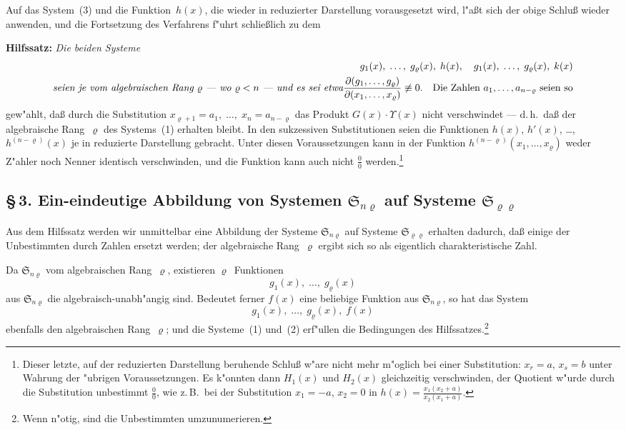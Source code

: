 \documentclass[11pt,a4paper]{article}
\begin{document}
Auf das System~(3) und die Funktion~$h(x)$, die wieder in reduzierter
Darstellung vorausgesetzt wird, l"{a}\ss{}t sich der obige Schlu\ss{} wieder anwenden,
und die Fortsetzung des Verfahrens f"{u}hrt schlie\ss{}lich zu dem

\medskip
\noindent
\textbf{Hilfssatz:} \emph{Die beiden Systeme}
\begin{align*}
g_{1}(x),\;\dots,\;g_{\varrho}(x),\;h(x),\quad g_{1}(x),\;\dots,\;g_{\varrho}(x),\;k(x)\\
\emph{seien je vom algebraischen Rang~$\varrho$ --- wo $\varrho<n$ --- und es sei etwa}
\frac{\partial(g_{1},\dots,g_{\varrho})}{\partial(x_{1},\dots,x_{\varrho})}\not\equiv 0.\quad \text{Die Zahlen } a_{1},\dots,a_{n-\varrho}\text{ seien so}
\end{align*}
gew"{a}hlt, da\ss{} durch die Substitution
$x_{\varrho+1}=a_{1},\;\dots,\;x_{n}=a_{n-\varrho}$
das Produkt $G(x)\cdot\Upsilon(x)$ nicht verschwindet --- d.\,h.\ da\ss{} der algebraische
Rang~$\varrho$ des Systems~(1) erhalten bleibt. In den sukzessiven Substitutionen
seien die Funktionen $h(x)$, $h'(x)$, \dots, $h^{(n-\varrho)}(x)$ je in reduzierte Darstellung
gebracht. Unter diesen Voraussetzungen kann in der Funktion $h^{(n-\varrho)}(x_{1},\dots,x_{\varrho})$
weder Z"{a}hler noch Nenner identisch verschwinden, und die Funktion kann
auch nicht $\frac{0}{0}$ werden.\footnote{Dieser letzte, auf der reduzierten Darstellung beruhende
Schlu\ss{} w"{a}re nicht mehr m"{o}glich bei einer Substitution: $x_{r}=a$, $x_{s}=b$ unter
Wahrung der "{u}brigen Voraussetzungen. Es k"{o}nnten dann $H_{1}(x)$ und $H_{2}(x)$
gleichzeitig verschwinden, der Quotient w"{u}rde durch die Substitution unbestimmt
$\frac{0}{0}$, wie z.\,B.\ bei der Substitution $x_{1}=-a$, $x_{2}=0$ in $h(x)=\frac{x_{1}(x_{2}+a)}{x_{2}(x_{1}+a)}$.}

\subsection*{\S\,3. Ein-eindeutige Abbildung von Systemen $\mathfrak{S}_{n\varrho}$ auf Systeme $\mathfrak{S}_{\varrho\varrho}$}

Aus dem Hilfssatz werden wir unmittelbar eine Abbildung der
Systeme $\mathfrak{S}_{n\varrho}$ auf Systeme $\mathfrak{S}_{\varrho\varrho}$ erhalten dadurch, da\ss{} einige der Unbestimmten
durch Zahlen ersetzt werden; der algebraische Rang~$\varrho$ ergibt sich so als
eigentlich charakteristische Zahl.

Da $\mathfrak{S}_{n\varrho}$ vom algebraischen Rang~$\varrho$, existieren $\varrho$~Funktionen
\begin{equation}
g_{1}(x),\;\dots,\;g_{\varrho}(x)
\tag{1}
\end{equation}
aus $\mathfrak{S}_{n\varrho}$ die algebraisch-unabh"{a}ngig sind. Bedeutet ferner $f(x)$ eine beliebige Funktion
aus $\mathfrak{S}_{n\varrho}$, so hat das System
\begin{equation}
g_{1}(x),\;\dots,\;g_{\varrho}(x),\;f(x)
\tag{2}
\end{equation}
ebenfalls den algebraischen Rang~$\varrho$; und die Systeme~(1) und~(2) erf"{u}llen
die Bedingungen des Hilfssatzes.\footnote{Wenn n"{o}tig, sind die Unbestimmten umzunumerieren.}
\end{document}
